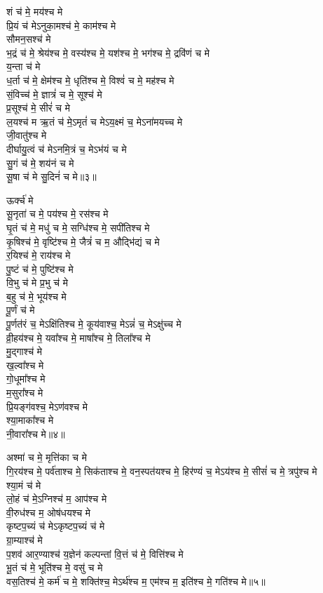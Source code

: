 शं च॑ मे॒ मय॑श्च मे\\
प्रि॒यं च॑ मेऽनुका॒मश्च॑ मे॒ काम॑श्च मे\\
सौमन॒सश्च॑ मे\\
भ॒द्रं च॑ मे॒ श्रेय॑श्च मे॒ वस्य॑श्च मे॒ यश॑श्च मे॒ भग॑श्च मे॒ द्रवि॑णं च मे\\
य॒न्ता च॑ मे\\
ध॒र्ता च॑ मे॒ क्षेम॑श्च मे॒ धृति॑श्च मे॒ विश्वं॑ च मे॒ मह॑श्च मे\\
सं॒विच्च॑ मे॒ ज्ञात्रं॑ च मे॒ सूश्च॑ मे\\
प्र॒सूश्च॑ मे॒ सीरं॑ च मे\\
ल॒यश्च॑ म ऋ॒तं च॑ मे॒ऽमृतं॑ च मेऽय॒क्ष्मं च॒ मेऽना॑मयच्च मे\\
जी॒वातु॑श्च मे\\
दीर्घायु॒त्वं च॑ मेऽनमि॒त्रं च॒ मेऽभ॑यं च मे\\
सु॒गं च॑ मे॒ शय॑नं च मे\\
सू॒षा च॑ मे सु॒दिनं॑ च मे॥३॥ 

ऊर्क्च॑ मे\\
सू॒नृता॑ च मे॒ पय॑श्च मे॒ रस॑श्च मे\\
घृ॒तं च॑ मे॒ मधु॑ च मे॒ सग्धि॑श्च मे॒ सपी॑तिश्च मे\\
कृ॒षिश्च॑ मे॒ वृष्टि॑श्च मे॒ जैत्रं॑ च म॒ औद्भि॑द्यं च मे\\
र॒यिश्च॑ मे॒ राय॑श्च मे\\
पु॒ष्टं च॑ मे॒ पुष्टि॑श्च मे\\
वि॒भु च॑ मे प्र॒भु च॑ मे\\
ब॒हु च॑ मे॒ भूय॑श्च मे\\
पू॒र्णं च॑ मे\\
पू॒र्णत॑रं च॒ मेऽक्षि॑तिश्च मे॒ कूय॑वाश्च॒ मेऽन्नं॑ च॒ मेऽक्षु॑च्च मे\\
व्री॒हय॑श्च मे॒ यवा᳚श्च मे॒ माषा᳚श्च मे॒ तिला᳚श्च मे\\
मु॒द्गाश्च॑ मे\\
ख॒ल्वा᳚श्च मे\\
गो॒धूमा᳚श्च मे\\
म॒सुरा᳚श्च मे\\
प्रि॒यङ्ग॑वश्च॒ मेऽण॑वश्च मे\\
श्या॒माका᳚श्च मे\\
नी॒वारा᳚श्च मे॥४॥ 

अश्मा॑ च मे॒ मृत्ति॑का च मे\\
गि॒रय॑श्च मे॒ पर्व॑ताश्च मे॒ सिक॑ताश्च मे॒ वन॒स्पत॑यश्च मे॒ हिर॑ण्यं च॒ मेऽय॑श्च मे॒ सीसं॑ च मे॒ त्रपु॑श्च मे\\
श्या॒मं च॑ मे\\
लो॒हं च॑ मे॒ऽग्निश्च॑ म॒ आप॑श्च मे\\
वी॒रुध॑श्च म॒ ओष॑धयश्च मे\\
कृष्टप॒च्यं च॑ मेऽकृष्टप॒च्यं च॑ मे\\
ग्रा॒म्याश्च॑ मे\\
प॒शव॑ आर॒ण्याश्च॑ य॒ज्ञेन॑ कल्पन्तां वि॒त्तं च॑ मे॒ वित्ति॑श्च मे\\
भू॒तं च॑ मे॒ भूति॑श्च मे॒ वसु॑ च मे\\
वस॒तिश्च॑ मे॒ कर्म॑ च मे॒ शक्ति॑श्च॒ मेऽर्थ॑श्च म॒ एम॑श्च म॒ इति॑श्च मे॒ गति॑श्च मे॥५॥ 


